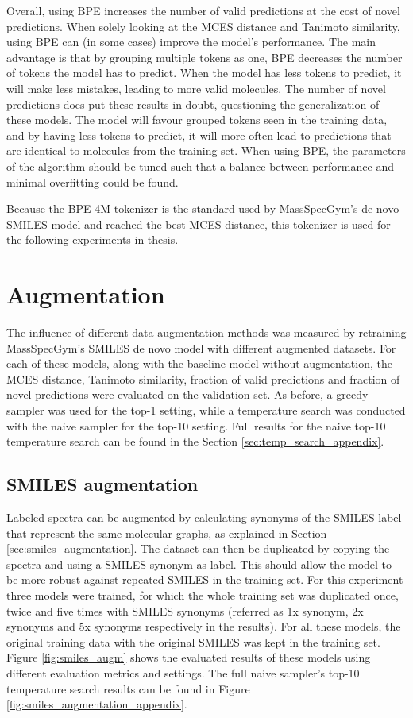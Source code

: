 Overall, using \ac{BPE} increases the number of valid predictions at the cost of novel predictions.
When solely looking at the MCES distance and Tanimoto similarity, using \ac{BPE} can (in some cases) improve the model's performance.
The main advantage is that by grouping multiple tokens as one, \ac{BPE} decreases the number of tokens the model has to predict.
When the model has less tokens to predict, it will make less mistakes, leading to more valid molecules.
The number of novel predictions does put these results in doubt, questioning the generalization of these models.
The model will favour grouped tokens seen in the training data, and by having less tokens to predict, it will more often lead to predictions that are identical to molecules from the training set.
When using \ac{BPE}, the parameters of the algorithm should be tuned such that a balance between performance and minimal overfitting could be found.

Because the \ac{BPE} 4M tokenizer is the standard used by MassSpecGym's de novo SMILES model and reached the best MCES distance, this tokenizer is used for the following experiments in thesis. 

\section{Augmentation}

The influence of different data augmentation methods was measured by retraining MassSpecGym's SMILES de novo model with different augmented datasets.
For each of these models, along with the baseline model without augmentation, the MCES distance, Tanimoto similarity, fraction of valid predictions and fraction of novel predictions were evaluated on the validation set.
As before, a greedy sampler was used for the top-1 setting, while a temperature search was conducted with the naive sampler for the top-10 setting.
Full results for the naive top-10 temperature search can be found in the Section \ref{sec:temp_search_appendix}.

\subsection{SMILES augmentation}

Labeled spectra can be augmented by calculating synonyms of the SMILES label that represent the same molecular graphs, as explained in Section \ref{sec:smiles_augmentation}.
The dataset can then be duplicated by copying the spectra and using a SMILES synonym as label.
This should allow the model to be more robust against repeated SMILES in the training set.
For this experiment three models were trained, for which the whole training set was duplicated once, twice and five times with SMILES synonyms (referred as 1x synonym, 2x synonyms and 5x synonyms respectively in the results).
For all these models, the original training data with the original SMILES was kept in the training set.
Figure \ref{fig:smiles_augm} shows the evaluated results of these models using different evaluation metrics and settings.
The full naive sampler's top-10 temperature search results can be found in Figure \ref{fig:smiles_augmentation_appendix}.

